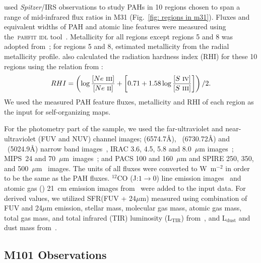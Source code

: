      \cite{Dim15} used {\it Spitzer}/IRS observations to study PAHs in 10 regions chosen to span a range of mid-infrared flux ratios in M31 (Fig.~\ref{fig: regions in m31}). 
     Fluxes and equivalent widths of PAH and atomic line features were measured using the~\textsc{pahfit idl} tool~\citep{Smith07b}.
     Metallicity for all regions except regions 5 and 8 was adopted from~\citep{Sanders12}; for regions 5 and 8, \cite{Dim15} estimated metallicity from the radial metallicity profile.
     \cite{Dim15} also calculated the radiation hardness index (RHI) for these 10 regions using the relation from \cite{Engelbracht08}:
     \begin{equation}
        RHI = \left (\log \frac{[Ne~\textsc{iii}]}{[Ne~\textsc{ii}]} + \left [ 0.71 + 1.58\log\frac{[S~\textsc{iv}]}{[S~\textsc{iii}]} \right ] \right )/2.
     \end{equation} 
     We used the measured PAH feature fluxes, metallicity and RHI of each region as the input for self-organizing maps.
     
    For the photometry part of the sample, we used the \GALEX \citep{Martin05} far-ultraviolet and near-ultraviolet (FUV and NUV) channel images; \halpha (6574.7\AA), \sii~(6730.72\AA) and \oiii~(5024.9\AA) narrow band images~\citep{Massey07}, IRAC 3.6, 4.5, 5.8 and 8.0~$\mu$m images~\citep{Barmby06}; MIPS~24 and 70~$\mu$m~images~\citep{Gordon06}; and PACS 100 and 160~$\mu$m and SPIRE 250, 350, and 500~$\mu$m~\citep{Fritz12} images.
     The units of all fluxes were converted to W~m$^{-2}$ in order to be the same as the PAH fluxes.
     $^{12}$CO (J:$1\rightarrow0$) line emission images~\citep{Nieten06} and atomic gas (\hi) 21~cm emission images from~\cite{Chemin09} were added to the input data. 
     For derived values, we utilized SFR(FUV + 24$\mu$m) measured using combination of FUV and 24$\mu$m emission, stellar mass, molecular gas mass, atomic gas mass, total gas mass, and total infrared (TIR) luminosity (L$_\mathrm{TIR}$) from~\cite{Rahmani16}, and L$_\mathrm{dust}$ and dust mass from~\cite{Draine14}.
     
    \subsection{M101 Observations}
    \label{Sec: data_M101_SOMN} 
    

